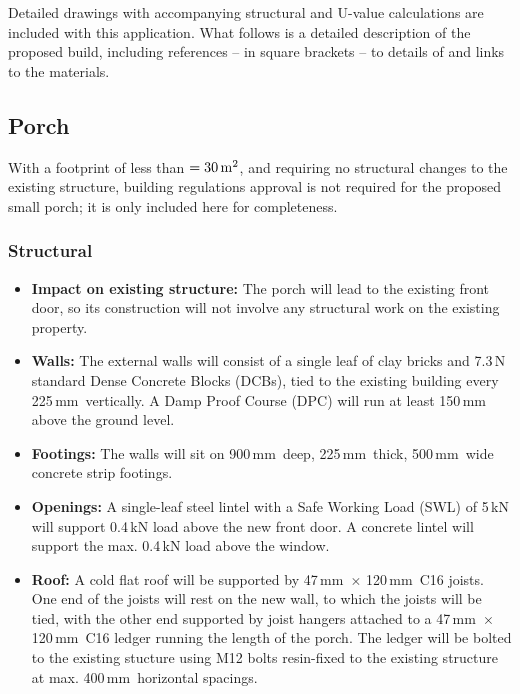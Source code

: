 \documentclass{extension}
\newcommand{\mm}{\,$\mathrm{mm}$}
\begin{document}
Detailed drawings with accompanying structural and U-value calculations are included with this application. What follows is a detailed description of the proposed build, including references -- in square brackets -- to details of and links to the materials.

\subsection{Porch}
\label{porch}
With a footprint of less than $=30\,{\rm m^2}$, and requiring no structural changes to the existing structure, building regulations approval is not required for the proposed small porch; it is only included here for completeness.
\subsubsection{Structural}
\begin{itemize}
  \item {\bf Impact on existing structure:} The porch will lead to the existing front door, so its construction will not involve any structural work on the existing property.
  \item {\bf Walls:} The external walls will consist of a single leaf of clay bricks and 7.3\,N standard Dense Concrete Blocks (DCBs), tied to the existing building every 225\mm\ vertically. A Damp Proof Course (DPC) will run at least 150\,mm above the ground level.
  \item{\bf Footings:} The walls will sit on 900\mm\ deep, 225\mm\ thick, 500\mm\ wide concrete strip footings.
  \item {\bf Openings:} A single-leaf steel lintel with a Safe Working Load (SWL) of 5\,kN\cite{psteel} will support 0.4\,kN load above the new front door. A concrete lintel\cite{pconc} will support the max. 0.4\,kN load above the window.
  \item {\bf Roof:} A cold flat roof will be supported by 47\mm\ $\times$ 120\mm\ C16 joists. One end of the joists will rest on the new wall, to which the joists will be tied, with the other end supported by joist hangers attached to a 47\mm\ $\times$ 120\mm\ C16 ledger running the length of the porch. The ledger will be bolted to the existing stucture using M12 bolts resin-fixed to the existing structure at max. 400\mm\ horizontal spacings.
\end{itemize}
\end{document}
